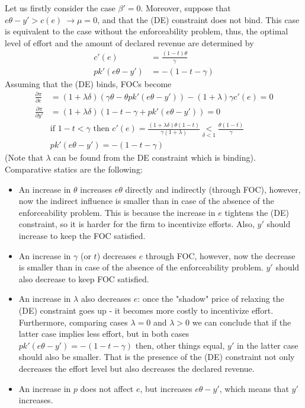 \documentclass[a4paper]{article}
\begin{document}
Let us firstly consider the case $\beta'=0$. Moreover, suppose that $e \theta - y' > c(e)\ \to \mu = 0$, and that the (DE) constraint does not bind. This case is equivalent to the case without the enforceability problem, thus, the optimal level of effort and the amount of declared revenue are determined by
\begin{align}
c'(e) &= \frac{(1 - t)\theta}{\gamma}\label{eq4}\\
pk'(e\theta - y') &= - (1 - t - \gamma) \label{eq5}
\end{align}
Assuming that the (DE) binds, FOCs become
\begin{align*}
\frac{\partial \pi}{\partial e} &= (1 + \lambda \delta)(\gamma \theta - \theta p k'(e \theta - y')) -(1+ \lambda) \gamma c'(e)= 0\\
\frac{\partial \pi}{\partial y'} &= (1 + \lambda \delta)(1 - t - \gamma+pk'(e\theta - y')) = 0\\
&\text{if }1-t < \gamma \text{ then }c'(e) = \frac{(1+\lambda \delta)\theta(1-t)}{\gamma (1 + \lambda)} \underset{\delta < 1}{<} \frac{\theta(1-t)}{\gamma}\\
&pk'(e \theta - y') = -(1 - t - \gamma)
\end{align*}
(Note that $\lambda$ can be found from the DE constraint which is binding). Comparative statics are the following:
\begin{itemize}
	\item An increase in $\theta$ increases $e \theta$ directly and indirectly (through FOC), however, now the indirect influence is smaller than in case of the absence of the enforceability problem. This is because the increase in $e$ tightens the (DE) constraint, so it is harder for the firm to incentivize efforts. Also, $y'$ should increase to keep the FOC satisfied.
	\item An increase in $\gamma$ (or $t$) decreases $e$ through FOC, however, now the decrease is smaller than in case of the absence of the enforceability problem. $y'$ should also decrease to keep FOC satisfied.
	\item An increase in $\lambda$ also decreases $e$: once the "shadow" price of relaxing the (DE) constraint goes up - it becomes more costly to incentivize effort. Furthermore, comparing cases $\lambda = 0$ and $\lambda > 0$ we can conclude that if the latter case implies less effort, but in both cases $pk'(e\theta - y') = -(1 - t - \gamma)$ then, other things equal, $y'$ in the latter case should also be smaller. That is the presence of the (DE) constraint not only decreases the effort level but also decreases the declared revenue.
	\item An increase in $p$ does not affect $e$, but increases $e \theta - y'$, which means that $y'$ increases.
\end{itemize}
\end{document}
